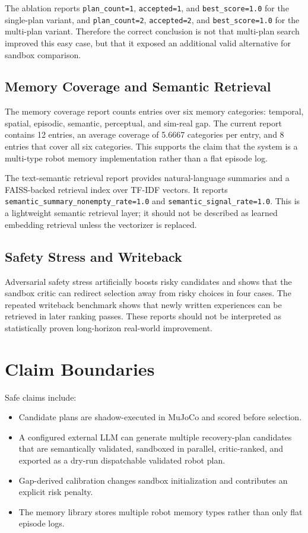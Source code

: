 \documentclass[conference]{IEEEtran}
\begin{document}
The ablation reports \texttt{plan\_count=1}, \texttt{accepted=1}, and \texttt{best\_score=1.0} for the single-plan variant, and \texttt{plan\_count=2}, \texttt{accepted=2}, and \texttt{best\_score=1.0} for the multi-plan variant. Therefore the correct conclusion is not that multi-plan search improved this easy case, but that it exposed an additional valid alternative for sandbox comparison.

\subsection{Memory Coverage and Semantic Retrieval}
The memory coverage report counts entries over six memory categories: temporal, spatial, episodic, semantic, perceptual, and sim-real gap. The current report contains 12 entries, an average coverage of 5.6667 categories per entry, and 8 entries that cover all six categories. This supports the claim that the system is a multi-type robot memory implementation rather than a flat episode log.

The text-semantic retrieval report provides natural-language summaries and a FAISS-backed retrieval index over TF-IDF vectors. It reports \texttt{semantic\_summary\_nonempty\_rate=1.0} and \texttt{semantic\_signal\_rate=1.0}. This is a lightweight semantic retrieval layer; it should not be described as learned embedding retrieval unless the vectorizer is replaced.

\subsection{Safety Stress and Writeback}
Adversarial safety stress artificially boosts risky candidates and shows that the sandbox critic can redirect selection away from risky choices in four cases. The repeated writeback benchmark shows that newly written experiences can be retrieved in later ranking passes. These reports should not be interpreted as statistically proven long-horizon real-world improvement.

\section{Claim Boundaries}
Safe claims include:
\begin{itemize}
    \item Candidate plans are shadow-executed in MuJoCo and scored before selection.
    \item A configured external LLM can generate multiple recovery-plan candidates that are semantically validated, sandboxed in parallel, critic-ranked, and exported as a dry-run dispatchable validated robot plan.
    \item Gap-derived calibration changes sandbox initialization and contributes an explicit risk penalty.
    \item The memory library stores multiple robot memory types rather than only flat episode logs.
\end{itemize}
\end{document}
